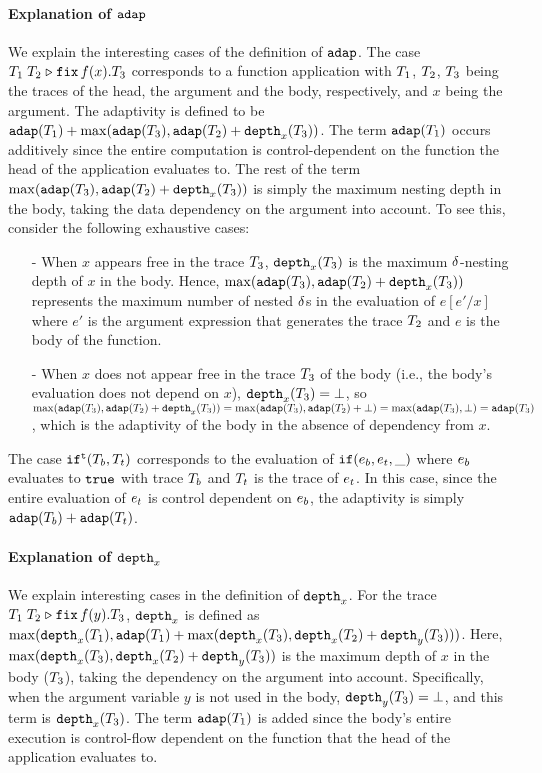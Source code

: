 \documentclass[a4paper,11pt]{article}
\theoremstyle{definition}
\begin{document}
\paragraph{Explanation of $\mathtt{adap}$}
We explain the interesting cases of the definition of $\mathtt{adap}$. The
case $T_1 \; T_2 \mathrel{\triangleright} {\mathop{\mathtt{fix}} f(x).T_3}$ corresponds to a function
application with $T_1$, $T_2$, $T_3$ being the traces of the
head, the argument and the body, respectively, and $x$ being the
argument. The adaptivity is defined to be $\mathtt{adap}(T_1) +
\max(\mathtt{adap}(T_3), \mathtt{adap}(T_2) + \mathtt{depth}_{x}(T_3))$. The term
$\mathtt{adap}(T_1)$ occurs additively since the entire computation is
control-dependent on the function the head of the application
evaluates to. The rest of the term $\max(\mathtt{adap}(T_3), \mathtt{adap}(T_2) +
\mathtt{depth}_{x}(T_3))$ is simply the maximum nesting depth in the body,
taking the data dependency on the argument into account. To see this,
consider the following exhaustive cases:
\begin{itemize}
  \item[-] When $x$ appears free in the trace $T_3$,
    $\mathtt{depth}_{x}(T_3)$ is the maximum $\delta$-nesting depth of $x$ in
    the body. Hence, $\max(\mathtt{adap}(T_3), \mathtt{adap}(T_2) +
    \mathtt{depth}_{x}(T_3))$ represents the maximum number of nested $\delta$s
    in the evaluation of $e[e'/x]$ where $e'$ is the argument
    expression that generates the trace $T_2$ and $e$ is the body of
    the function.
  \item[-] When $x$ does not appear free in the trace $T_3$ of the
    body (i.e., the body's evaluation does not depend on $x$),
    $\mathtt{depth}_{x}(T_3) = \bot$, so $\max(\mathtt{adap}(T_3), \mathtt{adap}(T_2) +
    \mathtt{depth}_{x}(T_3)) = \max(\mathtt{adap}(T_3), \mathtt{adap}(T_2) + \bot) =
    \max(\mathtt{adap}(T_3), \bot) = \mathtt{adap}(T_3)$, which is the adaptivity
    of the body in the absence of dependency from $x$.
\end{itemize}

The case $\mathtt{if}^{\mathtt{t}}(T_b, T_t)$ corresponds to the evaluation of
$\mathtt{if}(e_b, e_t, \_)$ where $e_b$ evaluates to $\mathtt{true}$
with trace $T_b$ and $T_t$ is the trace of $e_t$. In this
case, since the entire evaluation of $e_t$ is control dependent on
$e_b$, the adaptivity is simply $\mathtt{adap}(T_b) + \mathtt{adap}(T_t)$.

\paragraph{Explanation of $\mathtt{depth}_{x}$}
We explain interesting cases in the definition of $\mathtt{depth}_{x}$.  For the
trace $T_1 \; T_2 \mathrel{\triangleright} {\mathop{\mathtt{fix}} f(y).T_3}$, $\mathtt{depth}_{x}$ is defined as
$\max(\mathtt{depth}_{x}(T_1), \mathtt{adap}(T_1) + \max(\mathtt{depth}_{x}(T_3),
\mathtt{depth}_{x}(T_2) + \mathtt{depth}_{y}(T_3)))$. Here, $\max(\mathtt{depth}_{x}(T_3),
\mathtt{depth}_{x}(T_2) + \mathtt{depth}_{y}(T_3))$ is the maximum depth of $x$ in the
body ($T_3$), taking the dependency on the argument into
account. Specifically, when the argument variable $y$ is not used in
the body, $\mathtt{depth}_{y}(T_3) = \bot$, and this term is
$\mathtt{depth}_{x}(T_3)$.  The term $\mathtt{adap}(T_1)$ is added since the body's
entire execution is control-flow dependent on the function that the
head of the application evaluates to.
\end{document}
